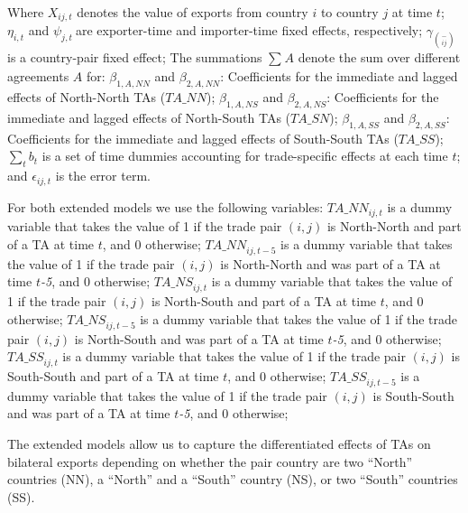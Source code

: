 Where \(X_{ij,t}\)\hspace{0pt} denotes the value of exports from country
\(i\) to country \(j\) at time \(t\); \(\eta_{i,t}\) and
\(\psi_{j,t}\ \)are exporter-time and importer-time fixed effects,
respectively; \(\gamma_{\binom{-}{ij}}\) is a country-pair fixed effect;
The summations \hspace{0pt}\(\sum_{}^{}A\) denote the sum over different
agreements \(A\) for: \(\beta_{1,A,NN}\) and \(\beta_{2,A,NN}\):
Coefficients for the immediate and lagged effects of North-North TAs
\hspace{0pt}(\(TA\_ NN\)); \(\beta_{1,A,NS}\) and \(\beta_{2,A,NS}\):
Coefficients for the immediate and lagged effects of North-South TAs
(\(TA\_ SN\)); \(\beta_{1,A,SS}\) and \(\beta_{2,A,SS}\): Coefficients
for the immediate and lagged effects of South-South TAs (\(TA\_ SS\));
\(\sum_{t}^{}b_{t}\) is a set of time dummies accounting for
trade-specific effects at each time \(t\); and \(\epsilon_{ij,t}\) is
the error term.

For both extended models we use the following variables:
\({TA\_ NN}_{ij,t}\) is a dummy variable that takes the value of 1 if
the trade pair \((i,j)\) is North-North and part of a TA at time \(t\),
and 0 otherwise; \({TA\_ NN}_{ij,t - 5}\) is a dummy variable that takes
the value of 1 if the trade pair \((i,j)\) is North-North and was part
of a TA at time \(t\)\emph{-5}, and 0 otherwise; \({TA\_ NS}_{ij,t}\) is
a dummy variable that takes the value of 1 if the trade pair \((i,j)\)
is North-South and part of a TA at time \(t\), and 0 otherwise;
\({TA\_ NS}_{ij,t - 5}\) is a dummy variable that takes the value of 1
if the trade pair \((i,j)\) is North-South and was part of a TA at time
\(t\)\emph{-5}, and 0 otherwise; \({TA\_ SS}_{ij,t}\) is a dummy
variable that takes the value of 1 if the trade pair \((i,j)\) is
South-South and part of a TA at time \(t\), and 0 otherwise;
\({TA\_ SS}_{ij,t - 5}\) is a dummy variable that takes the value of 1
if the trade pair \((i,j)\) is South-South and was part of a TA at time
\(t\)\emph{-5}, and 0 otherwise;

The extended models allow us to capture the differentiated effects of
TAs on bilateral exports depending on whether the pair country are two
``North'' countries (NN), a ``North'' and a ``South'' country (NS), or
two ``South'' countries (SS).